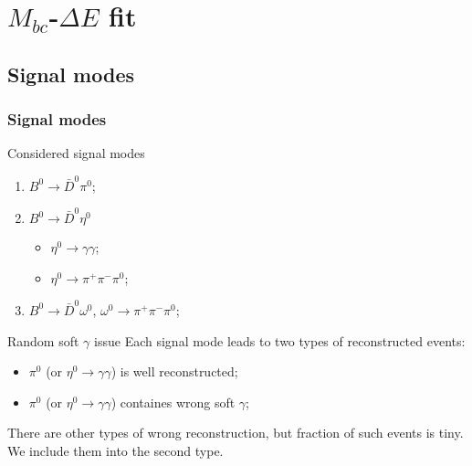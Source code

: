 \documentclass[10 pt,compress,mathserif]{beamer}
\newcommand{\bdpi}{\ensuremath{B^0\to \bar D^0\pi^0}\xspace}
\newcommand{\bdeta}{\ensuremath{B^0\to \bar D^0\eta^0}\xspace}
\newcommand{\etagg}{\ensuremath{\eta^0\to \gamma\gamma}\xspace}
\newcommand{\etappp}{\ensuremath{\eta^0\to \pi^+\pi^-\pi^0}\xspace}
\newcommand{\bdomega}{\ensuremath{B^0\to \bar D^0\omega^0}\xspace}
\newcommand{\omegappp}{\ensuremath{\omega^0\to \pi^+\pi^-\pi^0}\xspace}
\begin{document}
\section{$M_{bc}$-$\Delta E$ fit}
\subsection{Signal modes}
\frame{\tableofcontents[current]}
\begin{frame}
 \frametitle{Signal modes}
 \begin{block}{Considered signal modes}
 \begin{enumerate}
  \item \bdpi;
  \item \bdeta
  \begin{itemize}
   \item \etagg;
   \item \etappp;
  \end{itemize}
  \item \bdomega, \omegappp;
 \end{enumerate}
 \end{block}

 \begin{block}{Random soft $\gamma$ issue}
 Each signal mode leads to two types of reconstructed events:
  \begin{itemize}
   \item $\pi^0$ (or \etagg) is well reconstructed;
   \item $\pi^0$ (or \etagg) containes wrong soft $\gamma$;
  \end{itemize}
  There are other types of wrong reconstruction, but fraction of such events is tiny. We include them into the second type.
 \end{block}
\end{frame}
\end{document}
